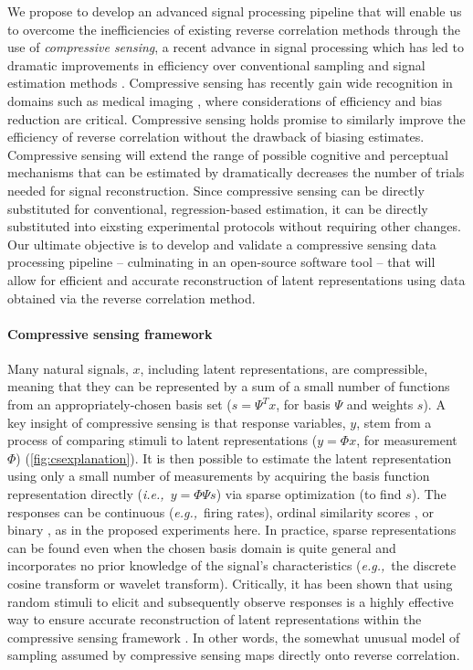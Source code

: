 \documentclass[11pt, notitlepage]{article} %
\def\eg{{\emph{e.g.,}}~}
\def\ie{{\emph{i.e.,}}~}
\begin{document}
We propose to develop an advanced signal processing pipeline
that will enable us to overcome the inefficiencies of existing reverse correlation methods
through the use of \emph{compressive sensing},
a recent advance in signal processing which has led to dramatic improvements in efficiency
over conventional sampling and signal estimation methods
\cite{baraniukCompressiveSensingLecture2007}.
Compressive sensing has recently gain wide recognition in domains such as medical imaging
\cite{graffCompressiveSensingMedical2015,lustigCompressedSensingMRI2008},
where considerations of efficiency and bias reduction are critical.
Compressive sensing holds promise to similarly improve the efficiency of reverse correlation
without the drawback of biasing estimates.
Compressive sensing will extend the range of possible cognitive and perceptual mechanisms that can be estimated
by dramatically decreases the number of trials needed for signal reconstruction.
Since compressive sensing can be directly substituted for conventional, regression-based estimation,
it can be directly substituted into eixsting experimental protocols without requiring other changes.
Our ultimate objective is to develop and validate a compressive sensing
data processing pipeline – culminating in an open-source software tool – that will allow for
efficient and accurate reconstruction of latent representations using data 
obtained via the reverse correlation method.

\paragraph{Compressive sensing framework}

Many natural signals, $x$, including latent representations, are compressible,
meaning that they can be represented by a sum of a small number of functions
from an appropriately-chosen basis set ($s = \Psi^{T}x$, for basis $\Psi$ and weights $s$).
A key insight of compressive sensing is that response variables, $y$,
stem from a process of comparing stimuli to latent representations
($y = \Phi x$, for measurement $\Phi$) (\autoref{fig:csexplanation}).
It is then possible to estimate the latent representation
using only a small number of measurements
by acquiring the basis function representation directly (\ie $ y = \Phi \Psi s$)
via sparse optimization (to find $s$).
The responses can be continuous (\eg firing rates),
ordinal similarity scores
\cite{zymnisCompressedSensingQuantized2010},
or binary \cite{boufounos1BitCompressiveSensing2008,planOneBitCompressedSensing2013},
as in the proposed experiments here.
In practice, sparse representations can be found even when the chosen basis domain is quite general
and incorporates no prior knowledge of the signal's characteristics
(\eg the discrete cosine transform or wavelet transform).
Critically, it has been shown that using random stimuli to elicit
and subsequently observe responses
is a highly effective way to ensure accurate reconstruction of latent representations
within the compressive sensing framework
\cite{candesIntroductionCompressiveSampling2008,candesRestrictedIsometryProperty2008,wojtaszczykStabilityInstanceOptimality2010}.
In other words, the somewhat
unusual model of sampling assumed by compressive sensing maps directly onto reverse correlation.
\end{document}
